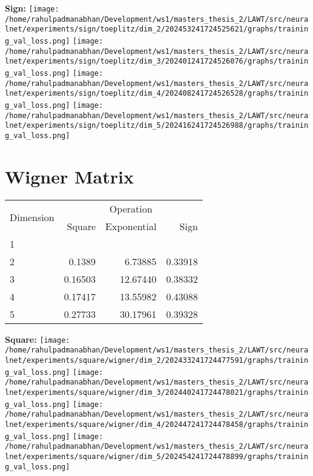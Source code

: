 \documentclass{article}
\begin{document}
\textbf{Sign:}
\texttt{[image: /home/rahulpadmanabhan/Development/ws1/masters\_thesis\_2/LAWT/src/neuralnet/experiments/sign/toeplitz/dim\_2/202453241724525621/graphs/training\_val\_loss.png]}
\texttt{[image: /home/rahulpadmanabhan/Development/ws1/masters\_thesis\_2/LAWT/src/neuralnet/experiments/sign/toeplitz/dim\_3/202401241724526076/graphs/training\_val\_loss.png]}
\texttt{[image: /home/rahulpadmanabhan/Development/ws1/masters\_thesis\_2/LAWT/src/neuralnet/experiments/sign/toeplitz/dim\_4/202408241724526528/graphs/training\_val\_loss.png]}
\texttt{[image: /home/rahulpadmanabhan/Development/ws1/masters\_thesis\_2/LAWT/src/neuralnet/experiments/sign/toeplitz/dim\_5/202416241724526988/graphs/training\_val\_loss.png]}


\pagebreak
\section{Wigner Matrix}
\begin{tabular}{@{}lrrr@{}}
\toprule
\multirow{2}{*}{Dimension} & \multicolumn{3}{c}{Operation} \\
\cmidrule(l){2-4}
& Square & Exponential & Sign \\
\midrule
1 & & & \\
2 & 0.1389 & 6.73885 & 0.33918 \\
3 & 0.16503 & 12.67440 & 0.38332 \\
4 & 0.17417 & 13.55982 & 0.43088 \\
5 & 0.27733 & 30.17961 & 0.39328 \\
\bottomrule
\end{tabular}

\textbf{Square:}
\texttt{[image: /home/rahulpadmanabhan/Development/ws1/masters\_thesis\_2/LAWT/src/neuralnet/experiments/square/wigner/dim\_2/202433241724477591/graphs/training\_val\_loss.png]}
\texttt{[image: /home/rahulpadmanabhan/Development/ws1/masters\_thesis\_2/LAWT/src/neuralnet/experiments/square/wigner/dim\_3/202440241724478021/graphs/training\_val\_loss.png]}
\texttt{[image: /home/rahulpadmanabhan/Development/ws1/masters\_thesis\_2/LAWT/src/neuralnet/experiments/square/wigner/dim\_4/202447241724478458/graphs/training\_val\_loss.png]}
\texttt{[image: /home/rahulpadmanabhan/Development/ws1/masters\_thesis\_2/LAWT/src/neuralnet/experiments/square/wigner/dim\_5/202454241724478899/graphs/training\_val\_loss.png]}
\end{document}
